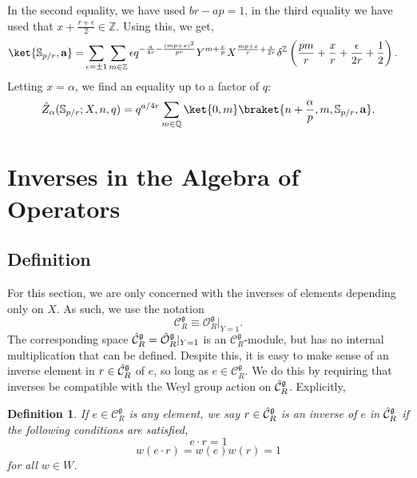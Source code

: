 \documentclass{article}
\newcommand{\Z}{{\mathbb Z}}
\newcommand{\Q}{{\mathbb Q}}
\newtheorem{definition}{Definition}
\numberwithin{corollary}{theorem}
\numberwithin{corollary}{proposition}
\begin{document}
In the second equality, we have used $ b r - a p =1$, in the third equality we have used that $ x+ \frac{r + \epsilon}{2} \in \Z$. Using this, we get, 
\begin{align*}
 \ket{\mathbb{S}_{p/r} , \mathbf{a} } = &   \sum_{\epsilon = \pm 1} \sum_{m \in \Z} \epsilon q^{- \frac{a}{4 r} - \frac{(m p + x)^{2}}{p r} }  Y^{ m + \frac{ x}{p}} X^{ \frac{ m p + x}{ r} + \frac{ \epsilon}{2 r} }  \delta^{\Z}\left(  \frac{p m }{r} + \frac{x}{r} + \frac{\epsilon}{2r} + \frac{1}{2}  \right).
\end{align*}
Letting $x=\alpha$, we find an equality up to a factor of $q$:
$$\hat{Z}_\alpha(\mathbb{S}_{p/r};X,n,q) = q^{a/4r}\sum_{m\in \Q}\ket{0,m} \braket{{n+\frac{\alpha}{p},m}, {\mathbb{S}_{p/r} , \mathbf{a} } }.$$ 







\section{Inverses in the Algebra of Operators}\label{high_rank_expansions}
\subsection*{Definition}
For this section, we are only concerned with the inverses of elements depending only on $X$. As such, we use the notation $$\mathcal{C}^\mathfrak{g}_R \equiv \mathcal{O}^\mathfrak{g}_R \vert_{Y=1}.$$
The corresponding space $\Hat{\mathcal{C}}^\mathfrak{g}_R = \hat{\mathcal{O}}^\mathfrak{g}_R|_{Y=1}$ is an $\mathcal{C}^\mathfrak{g}_R$-module, but has no internal multiplication that can be defined. Despite this, it is easy to make sense of an inverse element in $r \in \Hat{\mathcal{C}}^\mathfrak{g}_R$ of $e$, so long as $e \in \mathcal{C}^\mathfrak{g}_R$. We do this by requiring that inverses be compatible with the Weyl group action on $\Hat{\mathcal{C}}^\mathfrak{g}_R$. Explicitly,
\begin{definition}\label{weylcompatibleinverse}
    If $e \in \mathcal{C}^\mathfrak{g}_R$ is any element, we say $r \in \Hat{\mathcal{C}}^\mathfrak{g}_R$ is an inverse of $e$ in $\Hat{\mathcal{C}}^\mathfrak{g}_R$ if the following conditions are satisfied,
    $$e\cdot r = 1$$
    $$w(e\cdot r) = w(e) w(r) =1$$
    for all $w\in W$. 
    
\end{definition}
\end{document}
